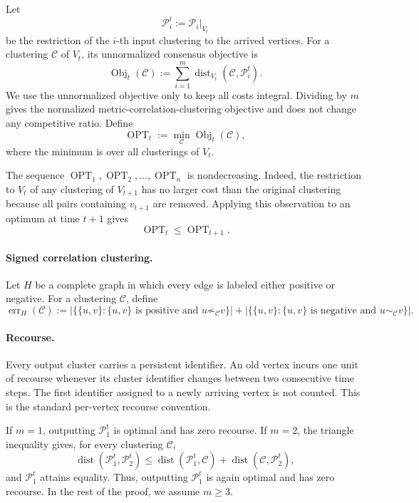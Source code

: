\documentclass[11pt]{article}
\theoremstyle{definition}
\theoremstyle{remark}
\newcommand{\C}{\mathcal C}
\newcommand{\Pp}{\mathcal P}
\newcommand{\OPT}{\operatorname{OPT}}
\newcommand{\Obj}{\operatorname{Obj}}
\newcommand{\err}{\operatorname{err}}
\newcommand{\dist}{\operatorname{dist}}
\newcommand{\1}{\mathbf 1}
\begin{document}
Let
\[
  \Pp_i^t:=\Pp_i|_{V_t}
\]
be the restriction of the $i$-th input clustering to the arrived vertices.
For a clustering $\C$ of $V_t$, its unnormalized consensus objective is
\begin{equation}\label{eq:consensus-objective}
  \Obj_t(\C)
  :=\sum_{i=1}^m\dist_{V_t}(\C,\Pp_i^t).
\end{equation}
We use the unnormalized objective only to keep all costs integral.  Dividing
by $m$ gives the normalized metric-correlation-clustering objective and does
not change any competitive ratio.  Define
\begin{equation}\label{eq:opt-definition}
  \OPT_t:=\min_{\C}\Obj_t(\C),
\end{equation}
where the minimum is over all clusterings of $V_t$.

The sequence $\OPT_1,\OPT_2,\ldots,\OPT_n$ is nondecreasing.  Indeed, the
restriction to $V_t$ of any clustering of $V_{t+1}$ has no larger cost than
the original clustering because all pairs containing $v_{t+1}$ are removed.
Applying this observation to an optimum at time $t+1$ gives
\begin{equation}\label{eq:opt-monotone}
  \OPT_t\le\OPT_{t+1}.
\end{equation}

\paragraph{Signed correlation clustering.}
Let $H$ be a complete graph in which every edge is labeled either positive
or negative.  For a clustering $\C$, define
\begin{equation}\label{eq:signed-error}
 \err_H(\C)
 :=
 \bigl|
   \{\{u,v\}:\{u,v\}\text{ is positive and }u\not\sim_{\C}v\}
 \bigr|
 +
 \bigl|
   \{\{u,v\}:\{u,v\}\text{ is negative and }u\sim_{\C}v\}
 \bigr|.
\end{equation}

\paragraph{Recourse.}
Every output cluster carries a persistent identifier.  An old vertex incurs
one unit of recourse whenever its cluster identifier changes between two
consecutive time steps.  The first identifier assigned to a newly arriving
vertex is not counted.  This is the standard per-vertex recourse convention.

If $m=1$, outputting $\Pp_1^t$ is optimal and has zero recourse.  If $m=2$,
the triangle inequality gives, for every clustering $\C$,
\[
 \dist(\Pp_1^t,\Pp_2^t)
 \le
 \dist(\Pp_1^t,\C)+\dist(\C,\Pp_2^t),
\]
and $\Pp_1^t$ attains equality.  Thus, outputting $\Pp_1^t$ is again optimal
and has zero recourse.  In the rest of the proof, we assume $m\ge3$.
\end{document}
